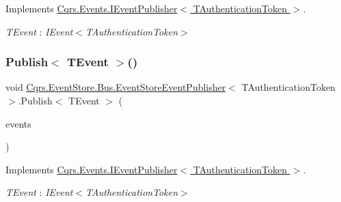 Implements \hyperlink{interfaceCqrs_1_1Events_1_1IEventPublisher_a02f0db0bc9b3aa1c7f766f58f8422ee3}{Cqrs.\+Events.\+I\+Event\+Publisher$<$ T\+Authentication\+Token $>$}.

\begin{Desc}
\item[Type Constraints]\begin{description}
\item[{\em T\+Event} : {\em I\+Event$<$T\+Authentication\+Token$>$}]\end{description}
\end{Desc}
\mbox{\label{classCqrs_1_1EventStore_1_1Bus_1_1EventStoreEventPublisher_a85b4922ff01b088b01b39463681c6eb6}} 
\subsubsection{\texorpdfstring{Publish$<$ T\+Event $>$()}{Publish< TEvent >()}\hspace{0.1cm}{\footnotesize\ttfamily [2/2]}}
{\footnotesize\ttfamily void \hyperlink{classCqrs_1_1EventStore_1_1Bus_1_1EventStoreEventPublisher}{Cqrs.\+Event\+Store.\+Bus.\+Event\+Store\+Event\+Publisher}$<$ T\+Authentication\+Token $>$.Publish$<$ T\+Event $>$ (\begin{DoxyParamCaption}\item[{I\+Enumerable$<$ T\+Event $>$}]{events }\end{DoxyParamCaption})}



Implements \hyperlink{interfaceCqrs_1_1Events_1_1IEventPublisher_a2cbcc3d2c24d015abef6337714ec51ff}{Cqrs.\+Events.\+I\+Event\+Publisher$<$ T\+Authentication\+Token $>$}.

\begin{Desc}
\item[Type Constraints]\begin{description}
\item[{\em T\+Event} : {\em I\+Event$<$T\+Authentication\+Token$>$}]\end{description}
\end{Desc}


